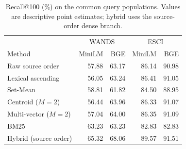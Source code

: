 \begin{table}[!t]
\centering
\caption{Recall@100 (\%) on the common query populations. Values are descriptive point estimates; hybrid uses the source-order dense branch.}
\label{tab:platform_recall}
\small
\setlength{\tabcolsep}{3pt}
\begin{tabular}{lrrrr}
\toprule
& \multicolumn{2}{c}{WANDS} & \multicolumn{2}{c}{ESCI} \\
Method & MiniLM & BGE & MiniLM & BGE \\
\midrule
Raw source order & 57.88 & 63.17 & 86.14 & 90.98 \\
Lexical ascending & 56.05 & 63.24 & 86.41 & 91.05 \\
Set-Mean & 58.81 & 61.82 & 84.50 & 88.95 \\
Centroid ($M=2$) & 56.44 & 63.96 & 86.33 & 91.07 \\
Multi-vector ($M=2$) & 57.04 & 64.00 & 86.35 & 91.09 \\
BM25 & 63.23 & 63.23 & 82.83 & 82.83 \\
Hybrid (source order) & 65.32 & 68.06 & 89.57 & 91.51 \\
\bottomrule
\end{tabular}
\end{table}
